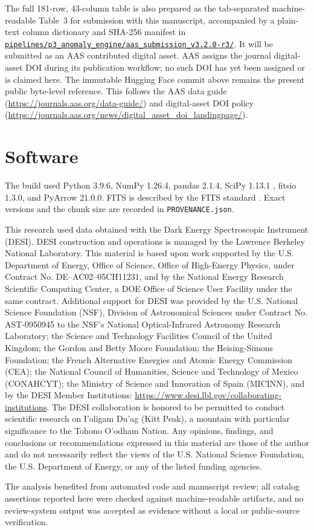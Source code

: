 \documentclass[twocolumn]{aastex701}
\newcommand{\repoBase}{https://github.com/Hubify-Projects/bigbounce/blob/main}
\newcommand{\artifact}[1]{\href{\repoBase/#1}{\nolinkurl{#1}}}
\begin{document}
The full 181-row, 43-column table is also prepared as the tab-separated machine-readable Table~3
for submission with this manuscript, accompanied by a plain-text column dictionary and SHA-256
manifest in
\artifact{pipelines/p3\_anomaly\_engine/aas\_submission\_v3.2.0-r3/}.  It will be submitted as an
AAS contributed digital asset.  AAS assigns the journal digital-asset DOI during its publication
workflow; no such DOI has yet been assigned or is claimed here.  The immutable Hugging Face commit
above remains the present public byte-level reference.  This follows the AAS data guide
(\url{https://journals.aas.org/data-guide/}) and digital-asset DOI policy
(\url{https://journals.aas.org/news/digital_asset_doi_landingpage/}).

\section*{Software}

The build used Python 3.9.6, NumPy 1.26.4, pandas 2.1.4, SciPy 1.13.1
\citep{Virtanen2020}, fitsio 1.3.0, and PyArrow 21.0.0.  FITS is described by
the FITS standard \citep{Pence2010}.  Exact versions and the chunk size are recorded in
\texttt{PROVENANCE.json}.

\begin{acknowledgments}
This research used data obtained with the Dark Energy Spectroscopic Instrument (DESI).  DESI
construction and operations is managed by the Lawrence Berkeley National Laboratory.  This
material is based upon work supported by the U.S. Department of Energy, Office of Science,
Office of High-Energy Physics, under Contract No. DE--AC02--05CH11231, and by the National Energy
Research Scientific Computing Center, a DOE Office of Science User Facility under the same
contract.  Additional support for DESI was provided by the U.S. National Science Foundation
(NSF), Division of Astronomical Sciences under Contract No. AST-0950945 to the NSF's National
Optical-Infrared Astronomy Research Laboratory; the Science and Technology Facilities Council
of the United Kingdom; the Gordon and Betty Moore Foundation; the Heising-Simons Foundation;
the French Alternative Energies and Atomic Energy Commission (CEA); the National Council of
Humanities, Science and Technology of Mexico (CONAHCYT); the Ministry of Science and Innovation
of Spain (MICINN), and by the DESI Member Institutions:
\url{https://www.desi.lbl.gov/collaborating-institutions}.  The DESI collaboration is honored to
be permitted to conduct scientific research on I'oligam Du'ag (Kitt Peak), a mountain with
particular significance to the Tohono O'odham Nation.  Any opinions, findings, and conclusions
or recommendations expressed in this material are those of the author and do not necessarily
reflect the views of the U.S. National Science Foundation, the U.S. Department of Energy, or
any of the listed funding agencies.

The analysis benefited from automated code and manuscript review; all catalog assertions
reported here were checked against machine-readable artifacts, and no review-system output was
accepted as evidence without a local or public-source verification.
\end{acknowledgments}
\end{document}
